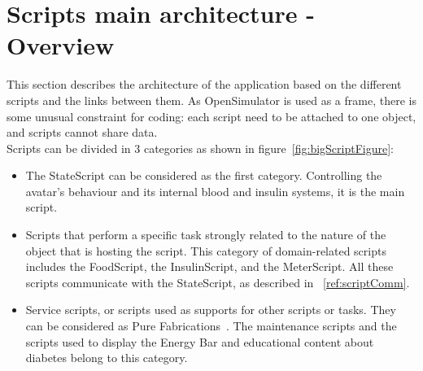 

\section{Scripts main architecture - Overview}

This section describes the architecture of the application based on the different scripts and the links between them.
As OpenSimulator is used as a frame, there is some unusual constraint for coding: each script need to be attached to one object, and scripts cannot share data. \\

Scripts can be divided in 3 categories as shown in figure~\ref{fig:bigScriptFigure}:
\begin{itemize}
\item The StateScript can be considered as the first category. Controlling the avatar's behaviour and its internal blood and insulin systems, it is the main script.
\item Scripts that perform a specific task strongly related to the nature of the object that is hosting the script. This category of domain-related scripts includes the FoodScript, the InsulinScript, and the MeterScript. All these scripts communicate with the StateScript, as described in ~\ref{ref:scriptComm}.
\item Service scripts, or scripts used as supports for other scripts or tasks. They can be considered as Pure Fabrications~\cite{neill2004imaging}. The maintenance scripts and the scripts used to display the Energy Bar and educational content about diabetes belong to this category.
\end{itemize}